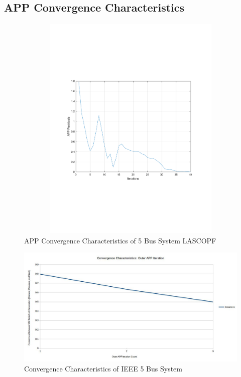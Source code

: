 \documentclass[preprint,12pt,3p]{elsarticle}
\begin{document}
	\subsection{APP Convergence Characteristics}
	\begin{figure}
		\begin{center}
			\vspace*{-2cm}
			\hspace*{2cm}
			\includegraphics[height=11cm,width=18cm]{APP Residuals.pdf}
			\caption{APP Convergence Characteristics of 5 Bus System LASCOPF}
			\label{fig:5BusLASCOPF}
		\end{center}
	\end{figure}
	\begin{figure}
		\begin{center}
			\includegraphics[width=0.92\linewidth,trim=5mm 12mm 5mm 5mm, clip]{N-1_SCOPF_5_Bus.jpg}
			\caption{Convergence Characteristics of IEEE 5 Bus System}
			\label{5Conv}
		\end{center}
	\end{figure}
\end{document}
